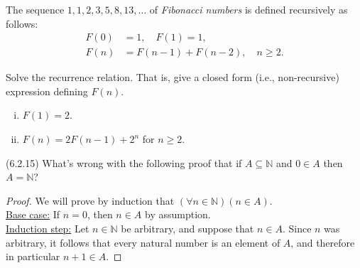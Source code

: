 \documentclass[addpoints,12pt]{exam}
\theoremstyle{remark}
\newcommand{\N}{\ensuremath{\mathbb N}}
\begin{document}
\begin{questions}
\newpage
\question The sequence $1, 1, 2, 3, 5, 8, 13, \dots$ of
\emph{Fibonacci numbers} is defined recursively as follows:
\begin{align*}
  F(0) &= 1, \quad F(1) = 1, \\
  F(n) & = F(n-1) + F(n-2), \quad n\geq 2.
\end{align*}
\newpage

\question[3]
Solve the recurrence relation.  That is, give a closed form (i.e., non-recursive)
expression defining $F(n)$.
\begin{enumerate}[(i)]
\item $F(1) = 2$.
\item $F(n) = 2F(n-1) + 2^n$ for $n\geq 2$.
\end{enumerate}

\newpage
\question[3] (6.2.15) What's wrong with the following proof that if
$A \subseteq \N$ and $0 \in A$ then $A = \N$?

\begin{proof}
  We will prove by induction that $(\forall n \in  \N)(n \in A)$.\\[10pt]
\underline{Base case:}
 If $n = 0$, then $n \in A$ by assumption. \\[10pt]
  \underline{Induction step:} Let $n \in \N$ be arbitrary, and suppose that
  $n \in A$. Since $n$ was arbitrary, it follows that every natural number is an
  element of $A$, and therefore in particular $n + 1 \in A$.
\end{proof}


\end{questions}

\vfill
{\large \begin{center} \gradetable[h] \end{center}  }
\thispagestyle{empty}
\end{document}
